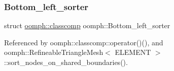 \subsubsection{\texorpdfstring{Bottom\+\_\+left\+\_\+sorter}{Bottom\_left\_sorter}}
{\footnotesize\ttfamily struct \hyperlink{structoomph_1_1classcomp}{oomph\+::classcomp}  oomph\+::\+Bottom\+\_\+left\+\_\+sorter}



Referenced by oomph\+::classcomp\+::operator()(), and oomph\+::\+Refineable\+Triangle\+Mesh$<$ E\+L\+E\+M\+E\+N\+T $>$\+::sort\+\_\+nodes\+\_\+on\+\_\+shared\+\_\+boundaries().

